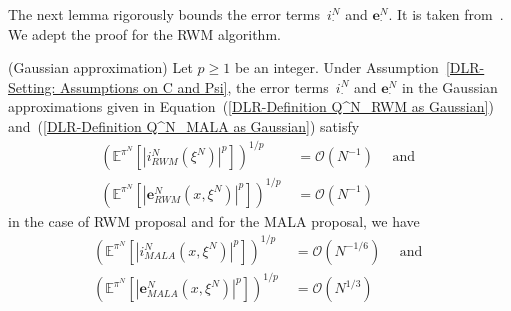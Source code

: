 The next lemma rigorously bounds the error terms~$i^N_{\cdot}$ and $\textbf{e}^N_{\cdot}$. It is taken from~\autocite[Lemma 4.4]{Pillai2012}. We adept the proof for the RWM algorithm.

\begin{lemma}(Gaussian approximation)
  \label{DLR: Lemma Gaussian approximation}
 Let $p \geq 1$ be an integer. Under Assumption~\ref{DLR-Setting: Assumptions on C and Psi}, the error terms~$i^N_{\cdot}$ and $\textbf{e}^N_{\cdot}$ in the Gaussian approximations given in Equation~(\ref{DLR-Definition Q^N_RWM as Gaussian}) and~(\ref{DLR-Definition Q^N_MALA as Gaussian}) satisfy
 \begin{equation}
   \begin{split}
     (\mathbb{E}^{\pi^N}[|i^N_{RWM}( \xi^N) |^p] )^{1/p} & \; = \mathcal{O}(N^{-1}) \quad \text{ and }\\
     (\mathbb{E}^{\pi^N}[|\textbf{e}^N_{RWM}(x, \xi^N)|^p] )^{1/p} & \; = \mathcal{O}(N^{-1})
   \end{split}
 \end{equation}
 in the case of RWM proposal and for the MALA proposal, we have
 \begin{equation}
   \begin{split}
     (\mathbb{E}^{\pi^N}[|i^N_{MALA}(x, \xi^N) |^p] )^{1/p} & \; = \mathcal{O}(N^{-1/6}) \quad \text{ and }\\
     (\mathbb{E}^{\pi^N}[|\textbf{e}^N_{MALA}(x, \xi^N)|^p] )^{1/p} & \; = \mathcal{O}(N^{1/3})
   \end{split}
 \end{equation}

\end{lemma}

